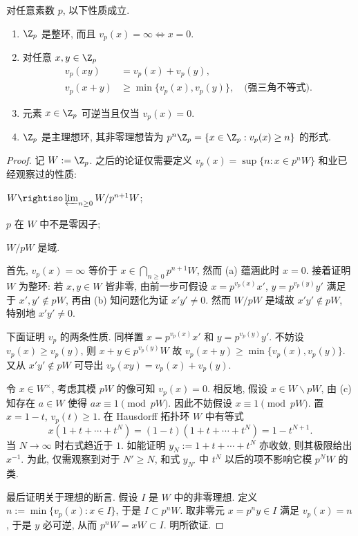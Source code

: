 \begin{proposition}\label{prop:p-adic}
	对任意素数 $p$, 以下性质成立.
	\begin{enumerate}
		\item $\Z_p$ 是整环, 而且 $v_p(x) = \infty \iff x=0$.
		\item 对任意 $x,y \in \Z_p$
			\begin{align*}
				v_p(xy) & = v_p(x) + v_p(y), \\
				v_p(x+y) & \geq \min\{v_p(x), v_p(y)\}, \quad \text{(强三角不等式)}.
			\end{align*}
		\item 元素 $x \in \Z_p$ 可逆当且仅当 $v_p(x)=0$.
		\item $\Z_p$ 是主理想环, 其非零理想皆为 $p^n \Z_p = \{x \in \Z_p: v_p(x) \geq n \}$ 的形式.
  \end{enumerate}
\end{proposition}
\begin{proof}
	记 $W := \Z_p$. 之后的论证仅需要定义 $v_p(x) = \sup\{n: x \in p^n W\}$ 和业已经观察过的性质:
	\begin{inparaenum}[(a)]
		\item $W \rightiso \varprojlim_{n \geq 0} W/p^{n+1}W$;
		\item $p$ 在 $W$ 中不是零因子;
		\item $W/pW$ 是域.
	\end{inparaenum}

	首先, $v_p(x)=\infty$ 等价于 $x \in \bigcap_{n \geq 0} p^{n+1}W$, 然而 (a) 蕴涵此时 $x=0$. 接着证明 $W$ 为整环: 若 $x,y \in W$ 皆非零, 由前一步可假设 $x=p^{v_p(x)} x'$, $y=p^{v_p(y)} y'$ 满足于 $x',y' \notin pW$, 再由 (b) 知问题化为证 $x'y' \neq 0$. 然而 $W/pW$ 是域故 $x'y' \notin pW$, 特别地 $x'y' \neq 0$.

	下面证明 $v_p$ 的两条性质. 同样置 $x = p^{v_p(x)} x'$ 和 $y = p^{v_p(y)} y'$. 不妨设 $v_p(x) \geq v_p(y)$, 则 $x+y \in p^{v_p(y)}W$ 故 $v_p(x+y) \geq \min\{ v_p(x), v_p(y)\}$. 又从 $x'y' \notin pW$ 可导出 $v_p(xy) = v_p(x) + v_p(y)$.

	令 $x \in W^\times$, 考虑其模 $pW$ 的像可知 $v_p(x) = 0$. 相反地, 假设 $x \in W \smallsetminus pW$, 由 (c) 知存在 $a \in W$ 使得 $ax \equiv 1 \pmod{pW}$. 因此不妨假设 $x \equiv 1 \pmod{pW}$. 置 $x = 1-t$, $v_p(t) \geq 1$. 在 Hausdorff 拓扑环 $W$ 中有等式
	\[ x(1 + t + \cdots + t^N) = (1 - t)(1 + t + \cdots + t^N) = 1 - t^{N+1}. \]
	当 $N \to \infty$ 时右式趋近于 $1$. 如能证明 $y_N := 1+ t +\cdots + t^N$ 亦收敛, 则其极限给出 $x^{-1}$. 为此, 仅需观察到对于 $N' \geq N$, 和式 $y_{N'}$ 中 $t^N$ 以后的项不影响它模 $p^N W$ 的类.

	最后证明关于理想的断言. 假设 $I$ 是 $W$ 中的非零理想. 定义 $n := \min\{v_p(x) : x \in I\}$, 于是 $I \subset p^n W$. 取非零元 $x = p^n y \in I$ 满足 $v_p(x)=n$, 于是 $y$ 必可逆, 从而 $p^n W = xW \subset I$. 明所欲证.
\end{proof}

